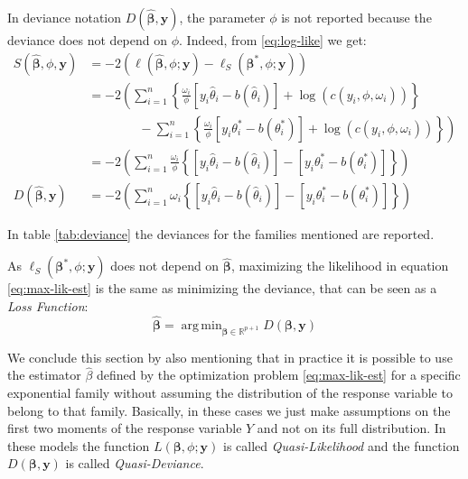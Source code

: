 \documentclass[a4paper, twoside, openright, 12pt]{report}
\DeclareMathOperator*{\argmin}{arg\,min}  %
\theoremstyle{definition}
\theoremstyle{definition}
\theoremstyle{definition}
\theoremstyle{remark}
\begin{document}
In deviance notation \(D(\hat{\boldsymbol{\beta}}, \boldsymbol{y})\), the parameter \(\phi\) is not reported because the deviance does not depend on \(\phi\). Indeed, from \eqref{eq:log-like} we get:
\begin{align*}
S(\hat{\boldsymbol{\beta}}, \phi, \boldsymbol{y})
& =
-2\left(
\ell\left(\hat{\boldsymbol{\beta}}, \phi; \boldsymbol{y}\right)
- \ell_{S}\left(\boldsymbol{\beta}^*, \phi; \boldsymbol{y}\right)
\right)
\\ & =
-2\left(
\sum_{i=1}^{n}{
\left\{
\frac{\omega_i}{\phi} \left[y_i\hat{\theta}_i - b(\hat{\theta}_i) \right] + \log{\left(c(y_i, \phi, \omega_i)\right)}
\right\}
}
\right.
\\ & \qquad \qquad -
\left.
\sum_{i=1}^{n}{
\left\{
\frac{\omega_i}{\phi} \left[y_i\theta_i^* - b(\theta_i^*) \right] + \log{\left(c(y_i, \phi, \omega_i)\right)}
\right\}
}
\right)
\\ & =
-2\left(
\sum_{i=1}^{n}{
\frac{\omega_i}{\phi}
\left\{
\left[y_i\hat{\theta}_i - b(\hat{\theta}_i) \right]
- \left[y_i\theta_i^* - b(\theta_i^*) \right]
\right\}
}
\right)
%
\\[12pt]
%
D(\hat{\boldsymbol{\beta}}, \boldsymbol{y})
& =
-2\left(
\sum_{i=1}^{n}{
\omega_i
\left\{
\left[y_i\hat{\theta}_i - b(\hat{\theta}_i) \right]
- \left[y_i\theta_i^* - b(\theta_i^*) \right]
\right\}
}
\right)
\end{align*}

In table \ref{tab:deviance} the deviances for the families mentioned are reported.

As \(\ell_{S}\left(\boldsymbol{\beta}^*, \phi; \boldsymbol{y}\right)\) does not depend on \(\hat{\boldsymbol{\beta}}\), maximizing the likelihood in equation \eqref{eq:max-lik-est} is the same as minimizing the deviance, that can be seen as a \emph{Loss Function}:
\begin{equation}
\label{eq:max-lik-est-deviance}
\hat{\boldsymbol{\beta}} = \argmin_{\boldsymbol{\beta}\in\mathbb{R}^{p+1}}{D(\boldsymbol{\beta}, \boldsymbol{y})}
\end{equation}

We conclude this section by also mentioning that in practice it is possible to use the estimator \(\hat{\beta}\) defined by the optimization problem \eqref{eq:max-lik-est} for a specific exponential family without assuming the distribution of the response variable to belong to that family. Basically, in these cases we just make assumptions on the first two moments of the response variable \(Y\) and not on its full distribution. In these models the function \(L\left(\boldsymbol{\beta}, \phi; \boldsymbol{y}\right)\) is called \emph{Quasi-Likelihood} and the function \(D(\boldsymbol{\beta}, \boldsymbol{y})\) is called \emph{Quasi-Deviance}.
\end{document}
